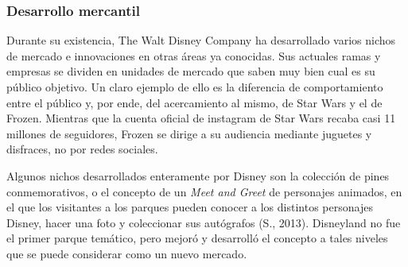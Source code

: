 \subsubsection{Desarrollo mercantil}
Durante su existencia, The Walt Disney Company ha desarrollado varios nichos de mercado e innovaciones en otras áreas ya conocidas. Sus actuales ramas y empresas se dividen en unidades de mercado que saben muy bien cual es su público objetivo. Un claro ejemplo de ello es la diferencia de comportamiento entre el público y, por ende, del acercamiento al mismo, de Star Wars y el de Frozen. Mientras que la cuenta oficial de instagram de Star Wars recaba casi 11 millones de seguidores, Frozen se dirige a su audiencia mediante juguetes y disfraces, no por redes sociales.
 
Algunos nichos desarrollados enteramente por Disney son la colección de pines conmemorativos, o el concepto de un \textit{Meet and Greet} de personajes animados, en el que los visitantes a los parques pueden conocer a los distintos personajes Disney, hacer una foto y coleccionar sus autógrafos (S., 2013). Disneyland no fue el primer parque temático, pero mejoró y desarrolló el concepto a tales niveles que se puede considerar como un nuevo mercado.


 
 